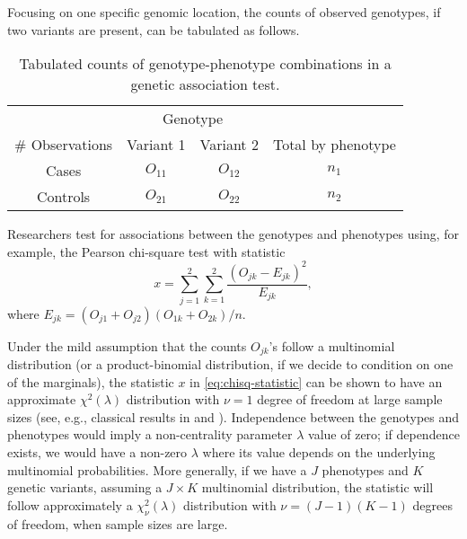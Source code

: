Focusing on one specific genomic location, the counts of observed genotypes, if two variants are present, can be tabulated as follows.
 \begin{table}[ht] \label{tab:multinomial-counts}
 \centering
\begin{center}
    \begin{tabular}{cccc}
    \hline
    & \multicolumn{2}{c}{Genotype} & \\
    \cline{2-3}
    \# Observations & Variant 1 & Variant 2 & Total by phenotype \\
    \hline
    Cases & $O_{11}$ & $O_{12}$ & $n_1$ \\
    Controls & $O_{21}$ & $O_{22}$ & $n_2$ \\
    \hline
    \end{tabular}
     \caption{Tabulated counts of genotype-phenotype combinations in a genetic association test.}
\end{center}
\end{table}
Researchers test for associations between the genotypes and phenotypes using, for example, the Pearson chi-square test with statistic
\begin{equation} \label{eq:chisq-statistic}
    x = \sum_{j=1}^2 \sum_{k=1}^2 \frac{(O_{jk} - E_{jk})^2}{E_{jk}},
\end{equation}
where ${E}_{jk} = (O_{j1}+O_{j2})(O_{1k}+O_{2k})/n$.

Under the mild assumption that the counts $O_{jk}$'s follow a multinomial distribution (or a product-binomial distribution, if we decide to condition on one of the marginals), the statistic $x$ in \eqref{eq:chisq-statistic} can be shown to have an approximate $\chi^2(\lambda)$ distribution with $\nu=1$ degree of freedom at large sample sizes (see, e.g., classical results in \citet{ferguson2017course} and
\cite{agresti2018introduction}). 
Independence between the genotypes and phenotypes would imply a non-centrality parameter $\lambda$ value of zero; if dependence exists, we would have a non-zero $\lambda$ where its value depends on the underlying multinomial probabilities.
More generally, if we have a $J$ phenotypes and $K$ genetic variants, assuming a $J\times K$ multinomial distribution, the statistic will follow approximately a $\chi^2_{\nu}(\lambda)$ distribution with $\nu = (J-1)(K-1)$ degrees of freedom, when sample sizes are large.

